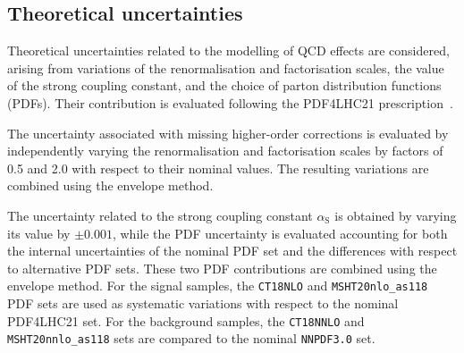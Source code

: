 \subsection{Theoretical uncertainties}
Theoretical uncertainties related to the modelling of QCD effects are considered, arising from variations of the renormalisation and factorisation scales, the value of the strong coupling constant, and the choice of parton distribution functions (PDFs). Their contribution is evaluated following the PDF4LHC21 prescription~\cite{Ball:2022oua}.

The uncertainty associated with missing higher-order corrections is evaluated by independently varying the renormalisation and factorisation scales by factors of 0.5 and 2.0 with respect to their nominal values. The resulting variations are combined using the envelope method.

The uncertainty related to the strong coupling constant $\alpha_{\mathrm{S}}$ is obtained by varying its value by $\pm 0.001$, while the PDF uncertainty is evaluated accounting for both the internal uncertainties of the nominal PDF set and the differences with respect to alternative PDF sets. These two PDF contributions are combined using the envelope method. For the signal samples, the \texttt{CT18NLO} and \texttt{MSHT20nlo\_as118} PDF sets are used as systematic variations with respect to the nominal PDF4LHC21 set. For the background samples, the \texttt{CT18NNLO} and \texttt{MSHT20nnlo\_as118} sets are compared to the nominal \texttt{NNPDF3.0} set.
